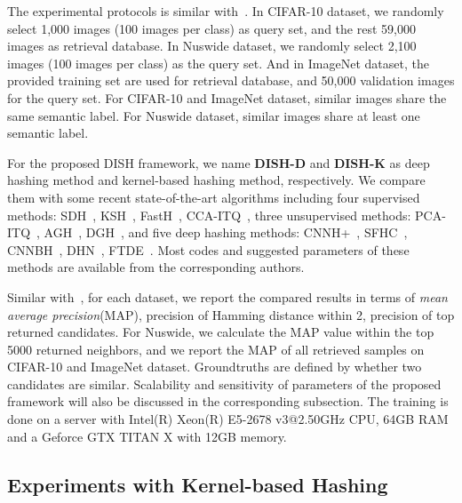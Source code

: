 \documentclass[conference]{IEEEtran}
\begin{document}
The experimental protocols is similar with~\cite{Shen_2015_CVPR,xia2014supervised}. In CIFAR-10 dataset, we randomly select 1,000 images (100 images per class) as query set, and the rest 59,000 images as retrieval database. In Nuswide dataset, we randomly select 2,100 images (100 images per class) as the query set. And in ImageNet dataset, the provided training set are used for retrieval database, and 50,000 validation images for the query set. For CIFAR-10 and ImageNet dataset, similar images share the same semantic label. For Nuswide dataset, similar images share at least one semantic label.

For the proposed DISH framework, we name \textbf{DISH-D} and \textbf{DISH-K} as deep hashing method and kernel-based hashing method, respectively. We compare them with some recent state-of-the-art algorithms including four supervised methods: SDH~\cite{Shen_2015_CVPR}, KSH~\cite{liu2012supervised}, FastH~\cite{lin2014fast}, CCA-ITQ~\cite{gong2013iterative}, three unsupervised methods: PCA-ITQ~\cite{gong2013iterative}, AGH~\cite{liu2011hashing}, DGH~\cite{liu2014discrete}, and five deep hashing methods: CNNH+~\cite{xia2014supervised}, SFHC~\cite{lai2015simultaneous}, CNNBH~\cite{guo2016hash}, DHN~\cite{zhu2016deep}, FTDE~\cite{zhuang2016fast}. Most codes and suggested parameters of these methods are available from the corresponding authors.

Similar with~\cite{liu2012supervised,xia2014supervised}, for each dataset, we report the compared results in terms of {\em mean average precision}(MAP), precision of Hamming distance within 2, precision of top returned candidates. For Nuswide, we calculate the MAP value within the top 5000 returned neighbors, and we report the MAP of all retrieved samples on CIFAR-10 and ImageNet dataset. Groundtruths are defined by whether two candidates are similar. Scalability and sensitivity of parameters of the proposed framework will also be discussed in the corresponding subsection. The training is done on a server with Intel(R) Xeon(R) E5-2678 v3@2.50GHz CPU, 64GB RAM and a Geforce GTX TITAN X with 12GB memory.

\subsection{Experiments with Kernel-based Hashing}
\label{subsec:kernel}
\end{document}
